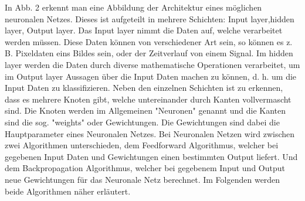 In Abb. 2 erkennt man eine Abbildung der Architektur eines möglichen neuronalen Netzes. Dieses ist aufgeteilt in mehrere Schichten: Input layer,hidden layer, Output layer. Das Input layer nimmt die Daten auf, welche verarbeitet werden müssen. Diese Daten können von verschiedener Art sein, so können es z. B. Pixeldaten eins Bildes sein, oder der Zeitverlauf von einem Signal. Im hidden layer werden die Daten durch diverse mathematische Operationen verarbeitet, um im Output layer Aussagen über die Input Daten machen zu können, d. h. um die Input Daten zu klassifizieren. Neben den einzelnen Schichten ist zu erkennen, dass es mehrere Knoten gibt, welche untereinander durch Kanten vollvermascht sind. Die Knoten werden im Allgemeinen "Neuronen" genannt und die Kanten sind die sog. "weights" oder Gewichtungen. Die Gewichtungen sind dabei die Hauptparameter eines Neuronalen Netzes. Bei Neuronalen Netzen wird zwischen zwei Algorithmen unterschieden, dem Feedforward Algorithmus, welcher bei gegebenen Input Daten und Gewichtungen einen bestimmten Output liefert. Und dem Backpropagation Algorithmus, welcher bei gegebenem Input und Output neue Gewichtungen für das Neuronale Netz berechnet. Im Folgenden werden beide Algorithmen näher erläutert. 



